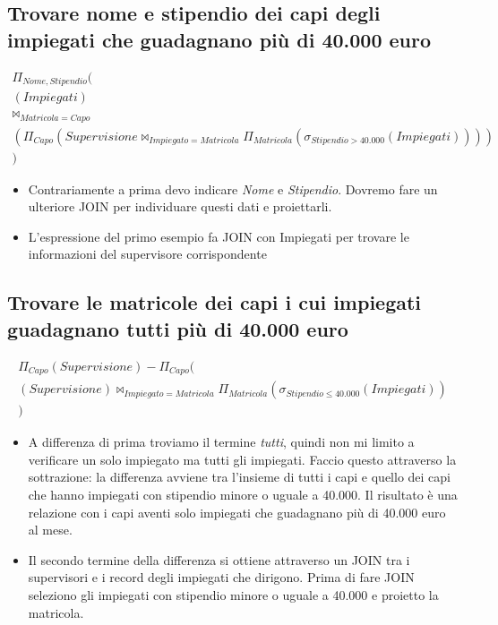 \subsection*{Trovare nome e stipendio dei capi degli impiegati che guadagnano più di 40.000 euro}
\begin{align*}
	\Pi_{Nome, Stipendio}(\\(Impiegati)\\\Join_{Matricola=Capo}\\(\Pi_{Capo}(Supervisione \Join_{Impiegato=Matricola} \Pi_{Matricola}(\sigma_{Stipendio > 40.000} (Impiegati))))\\)
\end{align*}
\begin{itemize}
	\item Contrariamente a prima devo indicare \emph{Nome} e \emph{Stipendio}. Dovremo fare un ulteriore JOIN per individuare questi dati e proiettarli.
	\item L'espressione del primo esempio fa JOIN con Impiegati per trovare le informazioni del supervisore corrispondente
\end{itemize}

\subsection*{Trovare le matricole dei capi i cui impiegati guadagnano tutti più di 40.000 euro}
\begin{align*}\Pi_{Capo}(Supervisione)-\Pi_{Capo}(\\(Supervisione) \Join_{Impiegato = Matricola} \Pi_{Matricola} (\sigma_{Stipendio \leq 40.000}(Impiegati))\\)\end{align*}
\begin{itemize}
	\item A differenza di prima troviamo il termine \emph{tutti}, quindi non mi limito a verificare un solo impiegato ma tutti gli impiegati. Faccio questo attraverso la sottrazione: la differenza avviene tra l'insieme di tutti i capi e quello dei capi che hanno impiegati con stipendio minore o uguale a 40.000. Il risultato è una relazione con i capi aventi solo impiegati che guadagnano più di 40.000 euro al mese.
	\item Il secondo termine della differenza si ottiene attraverso un JOIN tra i supervisori e i record degli impiegati che dirigono. Prima di fare JOIN seleziono gli impiegati con stipendio minore o uguale a 40.000 e proietto la matricola.
\end{itemize}

